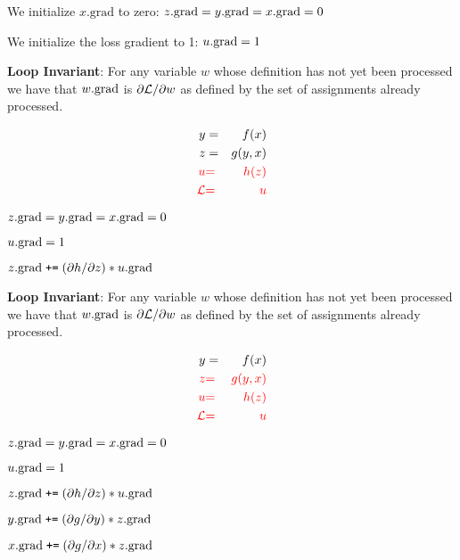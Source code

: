 {\bigskip
We initialize {\color{red} $x.\mathrm{grad}$} to zero: {\color{red} $z.\mathrm{grad} = y.\mathrm{grad} = x.\mathrm{grad} = 0$}

\bigskip
We initialize the loss gradient to 1: {\color{red} $u.\mathrm{grad} = 1$}

\medskip
{\bf Loop Invariant}: For any variable $w$ whose definition has not yet been processed we have that $w.\mathrm{grad}$ is $\partial {\cal L}/\partial w$ as defined by the set of assignments already processed.

\vspace{-3ex}
\begin{eqnarray*}
  y & = & f(x) \\
  z & = & g(y,x) \\
  {\color{red} u} & {\color{red} =} & {\color{red} h(z)} \\
  {\color{red} {\cal L}} & {\color{red}  =} &  {\color{red} u}
\end{eqnarray*}

{\color{red}
\medskip
$z.\mathrm{grad} = y.\mathrm{grad} = x.\mathrm{grad} = 0$

\medskip
$u.\mathrm{grad} = 1$

\medskip
$z.\mathrm{grad}\;\mbox{\tt +=}\;  ({\partial h}/{\partial z}) * u.\mathrm{grad}$

}

\medskip
{\bf Loop Invariant}: For any variable $w$ whose definition has not yet been processed we have that $w.\mathrm{grad}$ is $\partial {\cal L}/\partial w$ as defined by the set of assignments already processed.

\vspace{-3ex}
\begin{eqnarray*}
  y & = & f(x) \\
  {\color{red} z} & {\color{red} =} & {\color{red} g(y,x)} \\
  {\color{red} u} & {\color{red} =} & {\color{red} h(z)} \\
  {\color{red} {\cal L}} & {\color{red} =} & {\color{red}  u}
\end{eqnarray*}

{\color{red}
\medskip
$z.\mathrm{grad} = y.\mathrm{grad} = x.\mathrm{grad} = 0$

\medskip
$u.\mathrm{grad} = 1$

\medskip
$z.\mathrm{grad}\;\mbox{\tt +=}\; ({\partial h}/{\partial z}) * u.\mathrm{grad}$

\medskip
$y.\mathrm{grad} \;\mbox{\tt +=}\; ({\partial g}/{\partial y}) * z.\mathrm{grad}$

\medskip
$x.\mathrm{grad} \;\mbox{\tt +=}\; ({\partial g}/{\partial x}) * z.\mathrm{grad}$

}}
